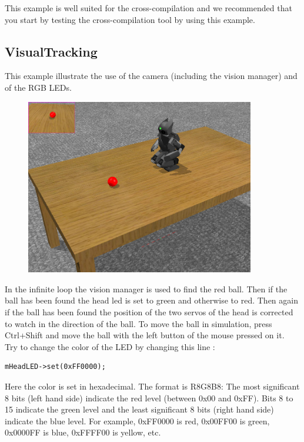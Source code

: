\documentclass[a4paper, 12pt]{article}  		%
\begin{document}
This example is well suited for the cross-compilation and we recommended that you start by testing the cross-compilation tool by using this example.\\

\newpage
\subsection{VisualTracking}

This example illustrate the use of the camera (including the vision manager) and of the RGB LEDs.\\

\begin{figure}[H]
\begin{center}
\includegraphics[width=10cm]{example_visualTracking.png}
\label{example_visualTracking.png}
\end{center}
\end{figure}

In the infinite loop the vision manager is used to find the red ball. 
Then if the ball has been found the head led is set to green and otherwise to red.
Then again if the ball has been found the position of the two servos of the head is corrected to watch in the direction of the ball. To move the ball in simulation, press Ctrl+Shift and move the ball with the left button of the mouse pressed on it.\\

Try to change the color of the LED by changing this line :
\lstset{language=c++} 
\lstset{commentstyle=\textit} 
\begin{lstlisting} 
mHeadLED->set(0xFF0000);
\end{lstlisting}
Here the color is set in hexadecimal. The format is R8G8B8: The most significant 8 bits (left hand side) indicate the red level (between 0x00 and 0xFF). Bits 8 to 15 indicate the green level and the least significant 8 bits (right hand side) indicate the blue level. For example, 0xFF0000 is red, 0x00FF00 is green, 0x0000FF is blue, 0xFFFF00 is yellow, etc.\\
\end{document}
